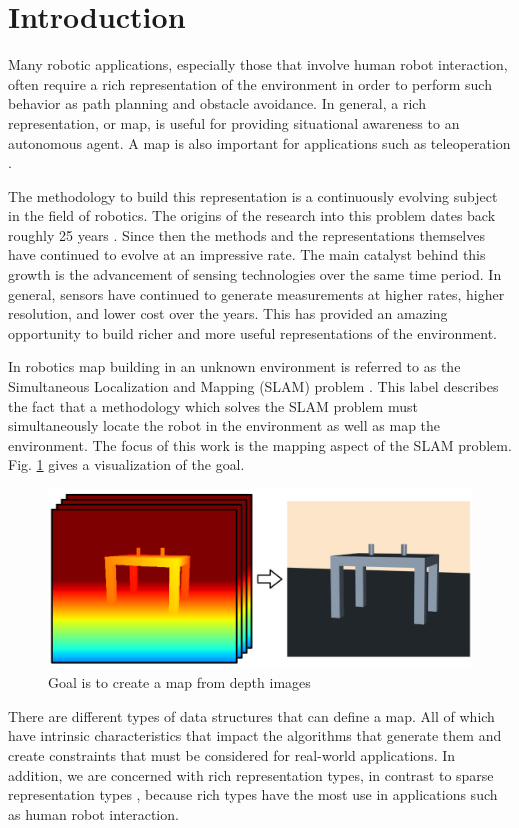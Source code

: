 
\section{Introduction} \label{sec:introduction}

Many robotic applications, especially those that involve human robot interaction, often require a rich representation of the environment in order to perform such behavior as path planning and obstacle avoidance. In general, a rich representation, or map, is useful for providing situational awareness to an autonomous agent. A map is also important for applications such as teleoperation \cite{Kadous2006}.

The methodology to build this
representation is a continuously evolving subject in the field of robotics.
The origins of the research into this problem dates back roughly 25 years \cite{Lorensen1987}.
Since then the methods and the representations themselves have continued to
evolve at an impressive rate. The main catalyst behind this growth is the
advancement of sensing technologies over the same time period. In general,
sensors have continued to generate measurements at higher rates, higher
resolution, and lower cost over the years. This has provided an amazing
opportunity to build richer and more useful representations of the
environment.

In robotics map building in an unknown environment is referred to as
the Simultaneous Localization and Mapping (SLAM) problem \cite{Thrun2002}. This label
describes the fact that a methodology which solves the SLAM problem must
simultaneously locate the robot in the environment as well as map the
environment. The focus of this work is the mapping aspect of the SLAM problem. Fig. \ref{fig:goal} gives a visualization of the goal.

\begin{figure}[h]%
\centering
\includegraphics[width=.5\textwidth]{figures/diagram_goal.png}
\caption{Goal is to create a map from depth images}
\label{fig:goal}
\end{figure}


There are different types of data structures that can define a map. All of which have intrinsic characteristics that impact the algorithms that generate them and create constraints that must be considered for real-world applications. In addition, we are concerned with rich representation types, in contrast to sparse representation types \cite{Dissanayake2001}, because rich types have the most use in applications such as human robot interaction.


